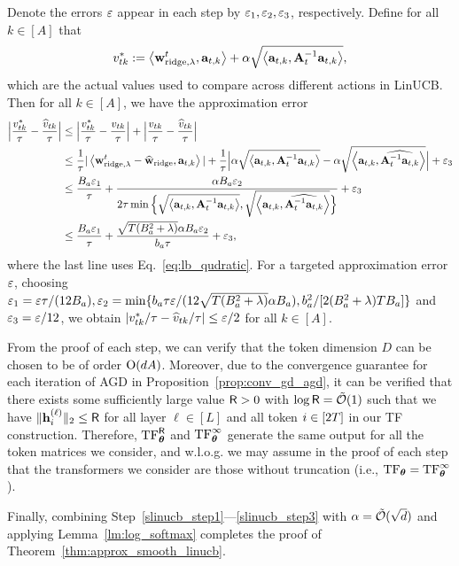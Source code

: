 Denote the errors $\varepsilon$ appear in each step by $\varepsilon_1,\varepsilon_2,\varepsilon_3$, respectively. Define for all $k\in[A]$ that $$
v^{*}_{tk}:=\left\langle{\mathbf w}^t_{{\rm ridge},\lambda},{\mathbf a}_{t,k}\right\rangle+\alpha\sqrt{\left\langle{\mathbf a}_{t,k}, {{\mathbf A}_t^{-1} {\mathbf a}_{t,k}}\right\rangle},
$$ which are the actual values used to compare across different actions in LinUCB. Then  for all $k\in[A]$, we have the approximation error 
\begin{align*}
    \Big|\frac{v_{tk}^*}{{\tau}}-\frac{\widehat v_{tk}}{{\tau}}\Big|
    &\leq
     \Big|\frac{v_{tk}^*}{{\tau}}- \frac{v_{tk}}{{\tau}}\Big|+ \Big|\frac{v_{tk}}{{\tau}}-\frac{\widehat v_{tk}}{{\tau}}\Big|\\
     &\leq
   \frac1{{\tau}} |\left\langle{\mathbf w}^t_{{\rm ridge},\lambda}-\widehat {{\mathbf w}}_{{\rm ridge}},{\mathbf a}_{t,k}\right\rangle|+\frac1{{\tau}}\Big|\alpha\sqrt{\left\langle{\mathbf a}_{t,k}, {{\mathbf A}_t^{-1} {\mathbf a}_{t,k}}\right\rangle}-\alpha\sqrt{\left\langle{\mathbf a}_{t,k}, \widehat{{\mathbf A}_t^{-1} {\mathbf a}_{t,k}}\right\rangle}\Big|+\varepsilon_3
    \\&\leq
    \frac{B_a\varepsilon_1}{{\tau}}+\frac{\alpha B_a\varepsilon_2}{2{\tau}\min\Big\{\sqrt{\left\langle{\mathbf a}_{t,k}, {{\mathbf A}_t^{-1} {\mathbf a}_{t,k}}\right\rangle},\sqrt{\left\langle{\mathbf a}_{t,k}, \widehat{{\mathbf A}_t^{-1} {\mathbf a}_{t,k}}\right\rangle}
    \Big\}}+\varepsilon_3\\
    &\leq \frac{B_a\varepsilon_1}{{\tau}}+\frac{\sqrt{T(B_a^2+\lambda)}  \alpha B_a\varepsilon_2}{b_a{\tau}}+\varepsilon_3,
\end{align*}
where the last line uses Eq.~\eqref{eq:lb_qudratic}. 
For a targeted approximation error $\varepsilon$, choosing 
 $\varepsilon_1=\varepsilon{\tau}/(12B_a),\varepsilon_2=\min\{b_a{\tau}\varepsilon/(12\sqrt{T(B_a^2+\lambda)}  \alpha B_a),b_a^2/[2(B_a^2+\lambda)TB_a]\}$ and $\varepsilon_3=\varepsilon/12$, we obtain $|v_{tk}^*/{\tau}-\widehat v_{tk}/{\tau}|\leq \varepsilon/2$ for all $k\in[A]$. 

 From the proof of each step, we can verify that the token dimension $D$ can be chosen to be of order ${\mathrm{O}}(dA)$. Moreover, due to the convergence guarantee for each iteration of AGD in Proposition~\ref{prop:conv_gd_agd}, it can be verified that there exists some sufficiently large value ${\mathsf{R}}>0$ with $\log {\mathsf{R}}={\tilde{\mathcal O}}(1)$ such that  we have $\| {\mathbf h}_i^{{(\ell)}} \|_{2} \leq{\mathsf{R}}$
 for all layer $\ell\in[L]$ and all token $i\in[2{T}]$ in our TF construction. Therefore, ${\rm TF}^{\mathsf{R}}_{\boldsymbol \theta}$ and ${\rm TF}^\infty_{\boldsymbol \theta}$ generate the same output for all the token matrices we consider, and w.l.o.g. we  may assume in the proof of each step  that the  transformers we consider are those without truncation (i.e., ${\rm TF}_{\boldsymbol \theta}={\rm TF}_{\boldsymbol \theta}^\infty$).

Finally, combining Step~\ref{slinucb_step1}---\ref{slinucb_step3} with $\alpha={\tilde{\mathcal O}}(\sqrt{d})$ and applying Lemma~\ref{lm:log_softmax} completes the proof of Theorem~\ref{thm:approx_smooth_linucb}.






